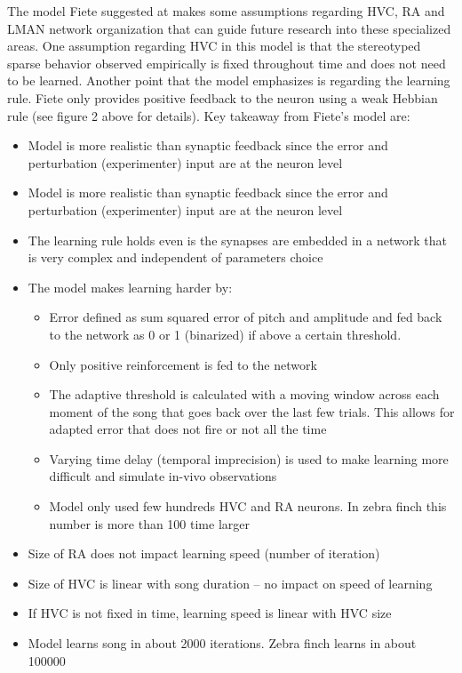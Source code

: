 \documentclass[draft,12pt,oneside]{CUNY_PhD}
\begin{document}
The model Fiete suggested at \cite{2} makes some assumptions regarding HVC, RA and LMAN network organization that can guide future research into these specialized areas. One assumption regarding HVC in this model is that the stereotyped sparse behavior observed empirically is fixed throughout time and does not need to be learned. Another point that the model emphasizes is regarding the learning rule. Fiete only provides positive feedback to the neuron using a weak Hebbian rule (see figure 2 above for details). Key takeaway from Fiete’s model are:
\begin{itemize}
    \item Model is more realistic than synaptic feedback since the error and perturbation (experimenter) input are at the neuron level
    \item Model is more realistic than synaptic feedback since the error and perturbation (experimenter) input are at the neuron level
    \item The learning rule holds even is the synapses are embedded in a network that is very complex and independent of parameters choice
    \item The model makes learning harder by:
    \begin{itemize}
        \item Error defined as sum squared error of pitch and amplitude and fed back to the network as 0 or 1 (binarized) if above a certain threshold.
        \item Only positive reinforcement is fed to the network
        \item The adaptive threshold is calculated with a moving window across each moment of the song that goes back over the last few trials. This allows for adapted error that does not fire or not all the time
        \item Varying time delay (temporal imprecision) is used to make learning more difficult and simulate in-vivo observations
        \item Model only used few hundreds HVC and RA neurons. In zebra finch this number is more than 100 time larger
    \end{itemize}
    \item Size of RA does not impact learning speed (number of iteration)
    \item Size of HVC is linear with song duration – no impact on speed of learning
    \item If HVC is not fixed in time, learning speed is linear with HVC size
    \item Model learns song in about 2000 iterations. Zebra finch learns in about 100000
\end{itemize} 
\end{document}
